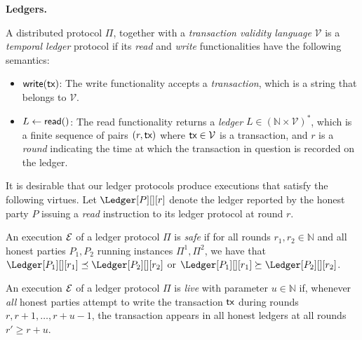 
\noindent
\textbf{Ledgers.}
\begin{definition}
A distributed protocol $\Pi$, together with a \emph{transaction validity language} $\mathcal{V}$
is a \emph{temporal ledger} protocol if its \emph{read} and \emph{write}
functionalities have the following semantics:

\begin{itemize}
  \item $\textsf{write}(\textsf{tx})$: The write functionality accepts a \emph{transaction}, which is
        a string that belongs to $\mathcal{V}$.
  \item $L \gets \textsf{read}()$: The read functionality returns a \emph{ledger} $L \in (\mathbb{N} \times \mathcal{V})^*$, which is
        a finite sequence of pairs $(r, \textsf{tx})$ where $\textsf{tx} \in \mathcal{V}$ is a transaction, and
        $r$ is a \emph{round} indicating the time at which the transaction in question
        is recorded on the ledger.
\end{itemize}
\end{definition}

It is desirable that our
ledger protocols produce executions that satisfy the following virtues.
Let $\Ledger[P][][r]$ denote the ledger reported by the honest party $P$
issuing a \emph{read} instruction to its ledger protocol at round $r$.

\begin{definition}[Safe]
  An execution $\mathcal{E}$ of a ledger protocol $\Pi$ is \emph{safe} if for all rounds $r_1, r_2 \in \mathbb{N}$
  and all honest parties $P_1, P_2$ running instances $\Pi^1, \Pi^2$,
  we have that
  $\Ledger[P_1][][r_1] \preceq \Ledger[P_2][][r_2]$ or
  $\Ledger[P_1][][r_1] \succeq \Ledger[P_2][][r_2]$.
\end{definition}


\begin{definition}[Live]
  An execution $\mathcal{E}$ of a ledger protocol $\Pi$ is \emph{live} with parameter $u \in \mathbb{N}$ if, whenever
  \emph{all} honest parties attempt to write the transaction $\textsf{tx}$ during
  rounds $r, r + 1, \ldots, r + u - 1$, the transaction appears in all
  honest ledgers at all rounds $r' \geq r + u$.
\end{definition}

